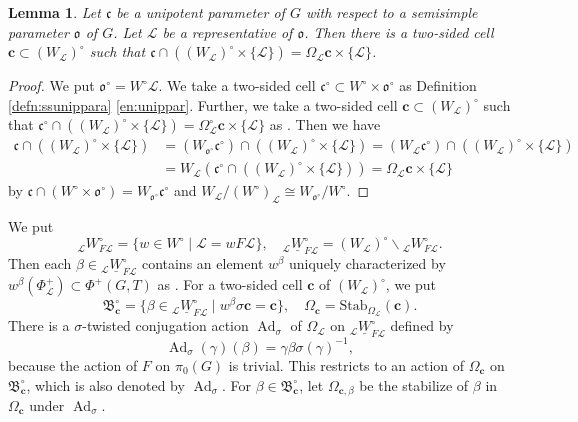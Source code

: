 \documentclass[12pt,a4paper]{article}
\newtheorem{lem}[thm]{Lemma}
\DeclareMathOperator{\Ad}{Ad}
\newcommand{\mc}{\mathcal}
\newcommand{\mr}{\mathrm}
\newcommand{\mf}{\mathfrak}
\newcommand{\mbf}{\mathbf}
\newcommand{\ul}{\underline}
\begin{document}
\begin{lem}\label{lem:ccexist}
	Let $\mf{c}$ be a unipotent parameter of $G$ with respect to a semisimple parameter $\mf{o}$ of $G$. 
	Let $\mc{L}$ be a representative of $\mf{o}$. 
	Then there is a two-sided cell 
	$\mbf{c} \subset (W_{\mc{L}})^{\circ}$ such that $\mf{c} \cap ((W_{\mc{L}})^{\circ} \times \{ \mc{L} \})=\Omega_{\mc{L}}  \mbf{c} \times \{\mc{L}\}$. 
\end{lem}
\begin{proof}
	We put 
	$\mf{o}^{\circ}=W^{\circ}\mc{L}$.  
	We take a two-sided cell $\mf{c}^{\circ} \subset W^{\circ} \times \mf{o}^{\circ}$ as 
	Definition \ref{defn:ssunippara} \ref{en:unippar}. 
	Further, we take a two-sided cell 
	$\mbf{c} \subset (W_{\mc{L}})^{\circ}$ such that $\mf{c}^{\circ} \cap ((W_{\mc{L}})^{\circ} \times \{ \mc{L} \})=\Omega_{\mc{L}}^{\circ} \mbf{c} \times \{\mc{L}\}$ as \cite[11.4]{LuYuEndHecchv3}. 
	Then we have 
	\begin{align*}
		\mf{c} \cap ((W_{\mc{L}})^{\circ} \times \{ \mc{L} \})&=(W_{\mf{o}^{\circ}} \mf{c}^{\circ}) \cap ((W_{\mc{L}})^{\circ} \times \{ \mc{L} \}) = (W_{\mc{L}} \mf{c}^{\circ}) \cap ((W_{\mc{L}})^{\circ} \times \{ \mc{L} \})\\ 
		&=W_{\mc{L}} (\mf{c}^{\circ} \cap ((W_{\mc{L}})^{\circ} \times \{ \mc{L} \}))=\Omega_{\mc{L}}  \mbf{c} \times \{\mc{L}\}
	\end{align*}
	by $\mf{c} \cap (W^{\circ} \times \mf{o}^{\circ})= W_{\mf{o}^{\circ}} \mf{c}^{\circ}$ and $W_{\mc{L}}/(W^{\circ})_{\mc{L}} \cong W_{\mf{o}^{\circ}}/W^{\circ}$. 
\end{proof}

We put 
\[
 {}_{\mc{L}}W^{\circ}_{F\mc{L}} =\{ w \in W^{\circ} \mid \mc{L}=wF\mc{L} \}, \quad 
 {}_{\mc{L}}\ul{W}^{\circ}_{F\mc{L}} =(W_{\mc{L}})^{\circ} \backslash {}_{\mc{L}}W^{\circ}_{F\mc{L}}. 
\]
Then each $\beta \in {}_{\mc{L}}\ul{W}^{\circ}_{F\mc{L}}$ contains an element $w^{\beta}$ uniquely characterized by 
$w^{\beta}(\Phi_{\mc{L}}^+) \subset \Phi^+(G,T)$ as \cite[4.2 Lemma]{LuYuEndHecchv3}. 
For a two-sided cell $\mbf{c}$ of $(W_{\mc{L}})^{\circ}$, 
we put 
\[
 \mf{B}_{\mbf{c}}^{\circ}= \{ \beta \in {}_{\mc{L}}\ul{W}^{\circ}_{F\mc{L}} \mid w^{\beta} \sigma \mbf{c} = \mbf{c} \}, \quad 
 \Omega_{\mbf{c}}=\mr{Stab}_{\Omega_{\mc{L}}}(\mbf{c}). 
\]
There is a $\sigma$-twisted conjugation action $\Ad_{\sigma}$ of $\Omega_{\mc{L}}$ on ${}_{\mc{L}}\ul{W}^{\circ}_{F\mc{L}}$ defined by 
\[
 \Ad_{\sigma} (\gamma) (\beta)=\gamma \beta {\sigma}(\gamma)^{-1}, 
\]
because the action of $F$ on $\pi_0 (G)$ is trivial. 
This restricts to an action of 
$\Omega_{\mbf{c}}$ on $\mf{B}_{\mbf{c}}^{\circ}$, 
which is also denoted by $\Ad_{\sigma}$. 
For $\beta \in \mf{B}_{\mbf{c}}^{\circ}$, 
let $\Omega_{\mbf{c},\beta}$ be the stabilize of $\beta$ in $\Omega_{\mbf{c}}$ under $\Ad_{\sigma}$. 
\end{document}

